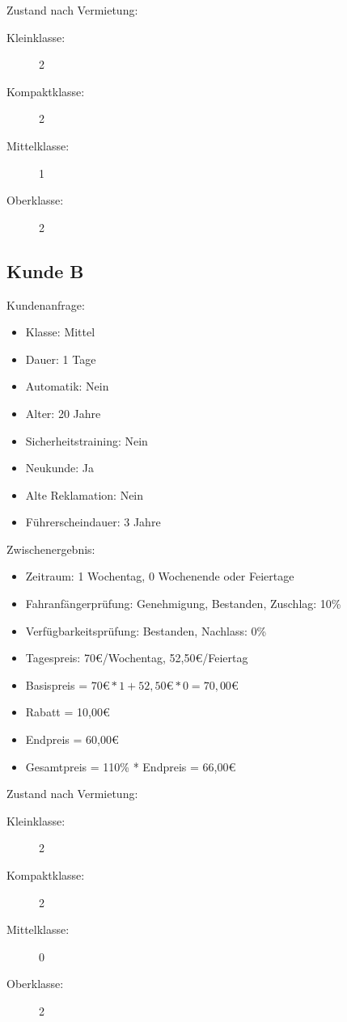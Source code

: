 Zustand nach Vermietung:
\begin{description}
	\item[Kleinklasse:] 2
	\item[Kompaktklasse:] 2
	\item[Mittelklasse:] 1
	\item[Oberklasse:] 2
\end{description}

\subsection{Kunde B}

Kundenanfrage:
\begin{itemize}
	\item Klasse: Mittel
	\item Dauer: 1 Tage
	\item Automatik: Nein
	
	\item Alter: 20 Jahre
	\item Sicherheitstraining: Nein
	\item Neukunde: Ja
	\item Alte Reklamation: Nein
	\item Führerscheindauer: 3 Jahre
\end{itemize}

Zwischenergebnis:
\begin{itemize}
	\item Zeitraum: 1 Wochentag, 0 Wochenende oder Feiertage
	\item Fahranfängerprüfung: Genehmigung, Bestanden, Zuschlag: 10\%
	\item Verfügbarkeitsprüfung: Bestanden, Nachlass: 0\%
	\item Tagespreis: 70€/Wochentag, 52,50€/Feiertag
	\item Basispreis = $70€ * 1 + 52,50€ * 0 = 70,00€$
	\item Rabatt = 10,00€
	\item Endpreis = 60,00€
	\item Gesamtpreis = 110\% * Endpreis = 66,00€
\end{itemize}

Zustand nach Vermietung:
\begin{description}
	\item[Kleinklasse:] 2
	\item[Kompaktklasse:] 2
	\item[Mittelklasse:] 0
	\item[Oberklasse:] 2
\end{description}

